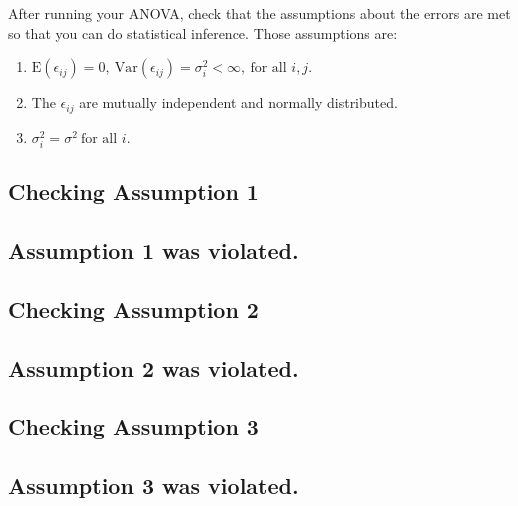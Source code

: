 \documentclass[
]{book}
\providecommand{\tightlist}{%
  \setlength{\itemsep}{0pt}\setlength{\parskip}{0pt}}
\begin{document}
After running your ANOVA, check that the assumptions about the errors
are met so that you can do statistical inference. Those assumptions are:

\begin{enumerate}
\def\labelenumi{\arabic{enumi}.}
\tightlist
\item
  \(\text{E}(\epsilon_{ij})=0,\ \text{Var}(\epsilon_{ij})=\sigma_{i}^2 < \infty,\ \text{for all }i, j.\)
\item
  The \(\epsilon_{ij}\) are mutually independent and normally
  distributed.
\item
  \(\sigma_{i}^2=\sigma^2\ \text{for all } i.\)
\end{enumerate}

\hypertarget{checking-assumption-1}{%
\subsection{Checking Assumption 1}\label{checking-assumption-1}}

\hypertarget{assumption-1-was-violated.}{%
\subsection{Assumption 1 was violated.}\label{assumption-1-was-violated.}}

\hypertarget{checking-assumption-2}{%
\subsection{Checking Assumption 2}\label{checking-assumption-2}}

\hypertarget{assumption-2-was-violated.}{%
\subsection{Assumption 2 was violated.}\label{assumption-2-was-violated.}}

\hypertarget{checking-assumption-3}{%
\subsection{Checking Assumption 3}\label{checking-assumption-3}}

\hypertarget{assumption-3-was-violated.}{%
\subsection{Assumption 3 was violated.}\label{assumption-3-was-violated.}}
\end{document}
